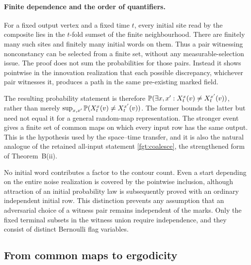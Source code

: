 \paragraph{Finite dependence and the order of quantifiers.}
For a fixed output vertex and a fixed time $t$, every initial site read by the composite lies in the $t$-fold sumset of the finite neighbourhood. There are finitely many such sites and finitely many initial words on them. Thus a pair witnessing nonconstancy can be selected from a finite set, without any measurable-selection issue. The proof does not sum the probabilities for those pairs. Instead it shows pointwise in the innovation realization that each possible discrepancy, whichever pair witnesses it, produces a path in the same pre-existing marked field.

The resulting probability statement is therefore $\mathbb{P}(\exists x,x':X_t^x(v)\ne X_t^{x'}(v))$, rather than merely $\sup_{x,x'}\mathbb{P}(X_t^x(v)\ne X_t^{x'}(v))$. The former bounds the latter but need not equal it for a general random-map representation. The stronger event gives a finite set of common maps on which every input row has the same output. This is the hypothesis used by the space--time transfer, and it is also the natural analogue of the retained all-input statement \cref{fgt:coalesce}, the strengthened form of Theorem~B(ii).

No initial word contributes a factor to the contour count. Even a start depending on the entire noise realization is covered by the pointwise inclusion, although attraction of an initial probability law is subsequently proved with an ordinary independent initial row. This distinction prevents any assumption that an adversarial choice of a witness pair remains independent of the marks. Only the fixed terminal subsets in the witness union require independence, and they consist of distinct Bernoulli flag variables.
\subsection{From common maps to ergodicity}

